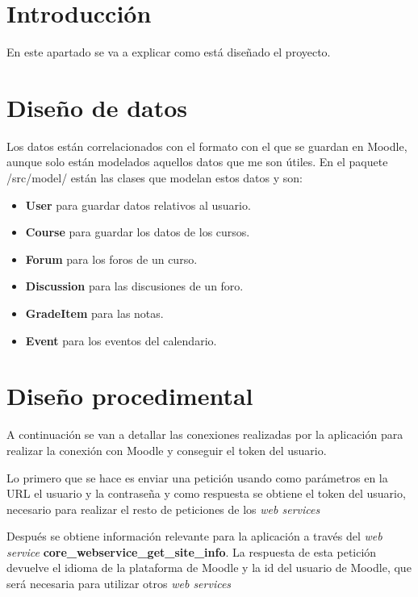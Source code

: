 
\section{Introducción}

En este apartado se va a explicar como está diseñado el proyecto.

\section{Diseño de datos}

Los datos están correlacionados con el formato con el que se guardan en Moodle, aunque solo están modelados aquellos datos que me son útiles. En el paquete /src/model/ están las clases que modelan estos datos y son:
\begin{itemize}
	\item \textbf{User} para guardar datos relativos al usuario.
	\item \textbf{Course} para guardar los datos de los cursos.
	\item \textbf{Forum} para los foros de un curso.
	\item \textbf{Discussion} para las discusiones de un foro.
	\item \textbf{GradeItem} para las notas.
	\item \textbf{Event} para los eventos del calendario.
\end{itemize}
\section{Diseño procedimental}

A continuación se van a detallar las conexiones realizadas por la aplicación para realizar la conexión con Moodle y conseguir el token del usuario.

Lo primero que se hace es enviar una petición usando como parámetros en la URL el usuario y la contraseña y como respuesta se obtiene el token del usuario, necesario para realizar el resto de peticiones de los \textit{web services}

Después se obtiene información relevante para la aplicación a través del \textit{web service} \textbf{core\_webservice\_get\_site\_info}. La respuesta de esta petición devuelve el idioma de la plataforma de Moodle y la id del usuario de Moodle, que será necesaria para utilizar otros \textit{web services}

